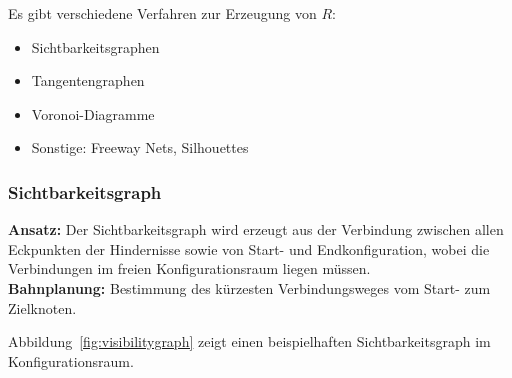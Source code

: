 			Es gibt verschiedene Verfahren zur Erzeugung von \(R\):
			\begin{itemize}
				\item Sichtbarkeitsgraphen
				\item Tangentengraphen
				\item Voronoi-Diagramme
				\item Sonstige: Freeway Nets, Silhouettes
			\end{itemize}

			\subsubsection{Sichtbarkeitsgraph}
				\textbf{Ansatz:} Der Sichtbarkeitsgraph wird erzeugt aus der Verbindung zwischen allen Eckpunkten der Hindernisse sowie von Start- und Endkonfiguration, wobei die Verbindungen im freien Konfigurationsraum liegen müssen. \\
				\textbf{Bahnplanung:} Bestimmung des kürzesten Verbindungsweges vom Start- zum Zielknoten.
				
				Abbildung~\ref{fig:visibilitygraph} zeigt einen beispielhaften Sichtbarkeitsgraph im Konfigurationsraum.
				
